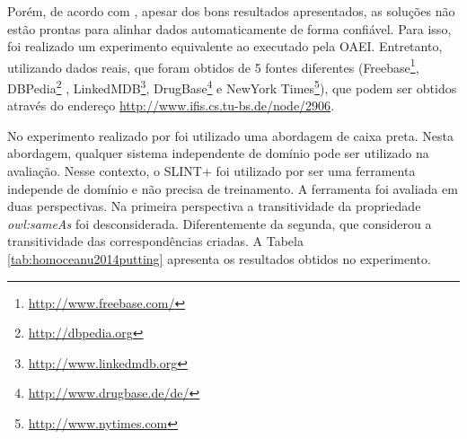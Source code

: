 Porém, de acordo com , apesar dos bons resultados apresentados, as soluções não estão prontas para alinhar dados automaticamente de forma confiável. Para isso, foi realizado um experimento equivalente ao executado pela OAEI. Entretanto, utilizando dados reais, que foram obtidos de 5 fontes diferentes (Freebase\footnote{\url{http://www.freebase.com/}}, DBPedia\footnote{\url{http://dbpedia.org}} , LinkedMDB\footnote{\url{http://www.linkedmdb.org}}, DrugBase\footnote{\url{http://www.drugbase.de/de/}} e NewYork Times\footnote{\url{http://www.nytimes.com}}), que podem ser obtidos através do endereço \url{http://www.ifis.cs.tu-bs.de/node/2906}.

No experimento realizado por  foi utilizado uma abordagem de caixa preta. Nesta abordagem, qualquer sistema independente de domínio pode ser utilizado na avaliação. Nesse contexto, o SLINT+ \cite{nguyen2012interlinking} foi utilizado por ser uma ferramenta independe de domínio e não precisa de treinamento.
A ferramenta foi avaliada em duas perspectivas. Na primeira perspectiva a transitividade da propriedade \textit{owl:sameAs} foi desconsiderada. Diferentemente da segunda, que considerou a transitividade das correspondências criadas. A Tabela \ref{tab:homoceanu2014putting} apresenta os resultados obtidos no experimento.

